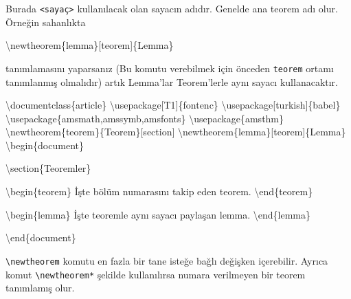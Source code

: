 \documentclass[
  letterpaper,
  DIV=11,
  numbers=noendperiod]{scrreprt}
\newenvironment{Shaded}{\begin{snugshade}}{\end{snugshade}}
\newcommand{\BuiltInTok}[1]{\textcolor[rgb]{0.00,0.23,0.31}{#1}}
\newcommand{\ExtensionTok}[1]{\textcolor[rgb]{0.00,0.23,0.31}{#1}}
\newcommand{\FunctionTok}[1]{\textcolor[rgb]{0.28,0.35,0.67}{#1}}
\newcommand{\KeywordTok}[1]{\textcolor[rgb]{0.00,0.23,0.31}{#1}}
\newcommand{\NormalTok}[1]{\textcolor[rgb]{0.00,0.23,0.31}{#1}}
\begin{document}
Burada \texttt{\textless{}sayaç\textgreater{}} kullanılacak olan sayacın
adıdır. Genelde ana teorem adı olur. Örneğin sahanlıkta

\begin{Shaded}
\begin{Highlighting}[]
\FunctionTok{\textbackslash{}newtheorem}\NormalTok{\{lemma\}[teorem]\{Lemma\}}
\end{Highlighting}
\end{Shaded}

tanımlamasını yaparsanız (Bu komutu verebilmek için önceden
\texttt{teorem} ortamı tanımlanmış olmalıdır) artık Lemma'lar
Teorem'lerle aynı sayacı kullanacaktır.

\begin{Shaded}
\begin{Highlighting}[]
\BuiltInTok{\textbackslash{}documentclass}\NormalTok{\{}\ExtensionTok{article}\NormalTok{\}}
\BuiltInTok{\textbackslash{}usepackage}\NormalTok{[T1]\{}\ExtensionTok{fontenc}\NormalTok{\}}
\BuiltInTok{\textbackslash{}usepackage}\NormalTok{[turkish]\{}\ExtensionTok{babel}\NormalTok{\}}
\BuiltInTok{\textbackslash{}usepackage}\NormalTok{\{}\ExtensionTok{amsmath,amssymb,amsfonts}\NormalTok{\}}
\BuiltInTok{\textbackslash{}usepackage}\NormalTok{\{}\ExtensionTok{amsthm}\NormalTok{\}}
\FunctionTok{\textbackslash{}newtheorem}\NormalTok{\{teorem\}\{Teorem\}[section]}
\FunctionTok{\textbackslash{}newtheorem}\NormalTok{\{lemma\}[teorem]\{Lemma\}}
\KeywordTok{\textbackslash{}begin}\NormalTok{\{}\ExtensionTok{document}\NormalTok{\}}

\KeywordTok{\textbackslash{}section}\NormalTok{\{Teoremler\}}

\KeywordTok{\textbackslash{}begin}\NormalTok{\{}\ExtensionTok{teorem}\NormalTok{\}}
\NormalTok{ İşte bölüm numarasını takip eden teorem.}
\KeywordTok{\textbackslash{}end}\NormalTok{\{}\ExtensionTok{teorem}\NormalTok{\}}

\KeywordTok{\textbackslash{}begin}\NormalTok{\{}\ExtensionTok{lemma}\NormalTok{\}}
\NormalTok{ İşte teoremle aynı sayacı paylaşan lemma.}
\KeywordTok{\textbackslash{}end}\NormalTok{\{}\ExtensionTok{lemma}\NormalTok{\}}

\KeywordTok{\textbackslash{}end}\NormalTok{\{}\ExtensionTok{document}\NormalTok{\}}
\end{Highlighting}
\end{Shaded}

\texttt{\textbackslash{}newtheorem} komutu en fazla bir tane isteğe
bağlı değişken içerebilir. Ayrıca komut
\texttt{\textbackslash{}newtheorem*} şekilde kullanılırsa numara
verilmeyen bir teorem tanımlamış olur.
\end{document}
